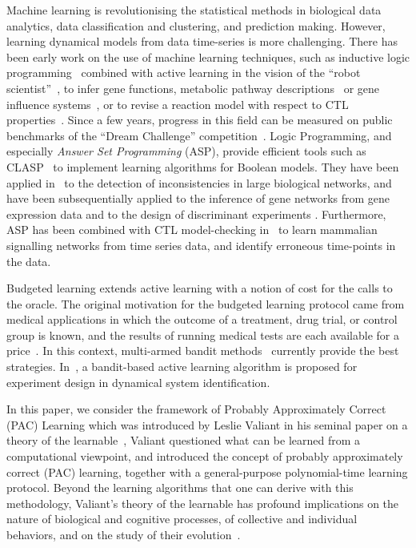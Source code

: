 \documentclass{llncs}
\begin{document}
Machine learning is revolutionising the statistical methods in biological data analytics,
data classification and clustering, and prediction making.
However, learning dynamical models from data time-series is more challenging.
There has been early work on the use of machine learning techniques, such as inductive
 logic programming~\cite{Muggleton95ngc} combined with active learning in the vision of the ``robot scientist''~\cite{BMOKRK01etai},
to infer gene functions,
metabolic pathway descriptions~\cite{AM02etai,AM02slps}
or gene influence systems~\cite{BCRG04jtb},
or to revise a reaction model with respect to CTL properties~\cite{CCFS06tcsb}.
Since a few years, progress in this field can be measured on public benchmarks
of the ``Dream Challenge'' competition~\cite{Meyer14bmc}.
Logic Programming, and especially \emph{Answer Set Programming} (ASP), provide efficient tools such as CLASP~\cite{GKNS07lpnmr}
to implement learning algorithms for Boolean models.
They have been applied in~\cite{GSTUV08iclp} to the detection of  inconsistencies in large biological networks,
and have been subsequentially applied to the inference of gene networks from gene expression data and to the design of discriminant experiments \cite{VKASSSG15frontiers}.
Furthermore, ASP has been combined with CTL model-checking in~\cite{OPSSG16biosystems} to learn mammalian signalling networks from time series data,
and identify erroneous time-points in the data.

Budgeted learning extends active learning with a notion of cost for the calls to the oracle.
The original motivation for the budgeted learning protocol came from medical applications in which the outcome of a treatment,
drug trial, or control group is known, and the results of running medical tests are each available for a price~\cite{DZBSM13ml}.
In this context, multi-armed bandit methods~\cite{DBSSZ07icdm} currently provide the best strategies.
In~\cite{LMALS14ecml}, a bandit-based active learning algorithm is proposed for experiment design in dynamical system identification.

In this paper, we consider the framework of Probably Approximately Correct (PAC) Learning 
which was introduced by Leslie Valiant in his seminal paper on a theory of the learnable~\cite{Valiant84cacm},
Valiant questioned what can be learned from a computational viewpoint,
and introduced the concept of probably approximately correct (PAC) learning,
together with a general-purpose polynomial-time learning protocol.
Beyond the learning algorithms that one can derive with this methodology,
Valiant's theory of the learnable has profound implications
on the nature of biological and cognitive processes,
of collective and individual behaviors,
and on the study of their evolution~\cite{Valiant13book}.
\end{document}
